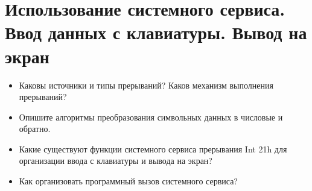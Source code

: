 \chapter{Использование системного сервиса. Ввод данных с клавиатуры. Вывод на экран}
\begin{itemize}
\item Каковы источники и типы прерываний? Каков механизм выполнения прерываний?
\item Опишите алгоритмы преобразования символьных данных в числовые и обратно.
\item Какие существуют функции системного сервиса прерывания Int 21h для организации ввода с клавиатуры и вывода на экран?
\item Как организовать программный вызов системного сервиса?
\end{itemize}
\endinput